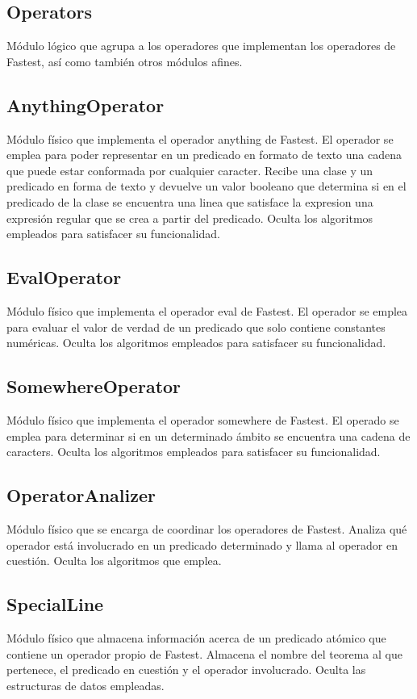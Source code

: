 \documentclass[a4paper,10pt]{report}
\begin{document}
		\subsection{Operators}
		Módulo lógico que agrupa a los operadores que implementan los operadores de Fastest, así como también otros módulos afines.
			\subsection{AnythingOperator}
			Módulo físico que implementa el operador anything de Fastest. El operador se emplea para poder representar en un predicado en formato de texto una cadena que puede estar conformada por cualquier caracter.
			Recibe una clase y un predicado en forma de texto y devuelve un valor booleano que determina si en el predicado de la clase se encuentra una linea que satisface la expresion una expresión regular que se crea a partir del predicado.
			Oculta los algoritmos empleados para satisfacer su funcionalidad.
			\subsection{EvalOperator}
			Módulo físico que implementa el operador eval de Fastest. El operador se emplea para evaluar el valor de verdad de un predicado que solo contiene constantes numéricas.
			Oculta los algoritmos empleados para satisfacer su funcionalidad.
			\subsection{SomewhereOperator}
			Módulo físico que implementa el operador somewhere de Fastest. El operado se emplea para determinar si en un determinado ámbito se encuentra una cadena de caracters.
			Oculta los algoritmos empleados para satisfacer su funcionalidad.
			\subsection{OperatorAnalizer}
			Módulo físico que se encarga de coordinar los operadores de Fastest. Analiza qué operador está involucrado en un predicado determinado y llama al operador en cuestión.
			Oculta los algoritmos que emplea.
			\subsection{SpecialLine}
			Módulo físico que almacena información acerca de un predicado atómico que contiene un operador propio de Fastest. Almacena el nombre del teorema al que pertenece, el predicado en cuestión y el operador involucrado.
			Oculta las estructuras de datos empleadas.
\end{document}
